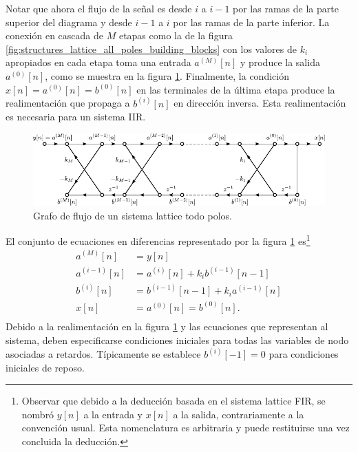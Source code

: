 \documentclass[a4paper]{report}
\begin{document}
Notar que ahora el flujo de la señal es desde \(i\) a \(i-1\) por las ramas de la parte superior del diagrama y desde \(i-1\) a \(i\) por las ramas de la parte inferior. La conexión en cascada de \(M\) etapas como la de la figura \ref{fig:structures_lattice_all_poles_building_blocks} con los valores de \(k_i\) apropiados en cada etapa toma una entrada \(a^{(M)}[n]\) y produce la salida \(a^{(0)}[n]\), como se muestra en la figura \ref{fig:structures_lattice_all_poles_building_blocks_connection}. Finalmente, la condición \(x[n]=a^{(0)}[n]=b^{(0)}[n]\) en las terminales de la última etapa produce la realimentación que propaga a \(b^{(i)}[n]\) en dirección inversa. Esta realimentación es necesaria para un sistema IIR.
\begin{figure}[!htb]
 \begin{center}
 \includegraphics[width=1\textwidth]{figuras/structures_lattice_all_poles_building_blocks_connection.pdf}
 \caption{\label{fig:structures_lattice_all_poles_building_blocks_connection} Grafo de flujo de un sistema lattice todo polos.}
 \end{center}
\end{figure}

El conjunto de ecuaciones en diferencias representado por la figura \ref{fig:structures_lattice_all_poles_building_blocks_connection} es\footnote{Observar que debido a la deducción basada en el sistema lattice FIR, se nombró \(y[n]\) a la entrada y \(x[n]\) a la salida, contrariamente a la convención usual. Esta nomenclatura es arbitraria y puede restituirse una vez concluida la deducción.}
\begin{equation}\label{eq:structures_lattice_difference_equations_set_all_poles}
 \begin{aligned}
  a^{(M)}[n]&=y[n]\\
  a^{(i-1)}[n]&=a^{(i)}[n]+k_ib^{(i-1)}[n-1]\\
  b^{(i)}[n]&=b^{(i-1)}[n-1]+k_ia^{(i-1)}[n]\\
  x[n]&=a^{(0)}[n]=b^{(0)}[n].  
 \end{aligned}
\end{equation}
\begin{align*}
\end{align*}
Debido a la realimentación en la figura \ref{fig:structures_lattice_all_poles_building_blocks_connection} y las ecuaciones que representan al sistema, deben especificarse condiciones iniciales para todas las variables de nodo asociadas a retardos. Típicamente se establece \(b^{(i)}[-1]=0\) para condiciones iniciales de reposo. 
\end{document}
